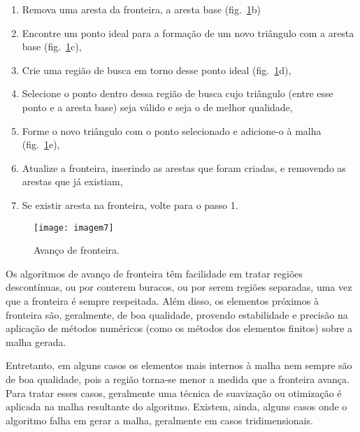  \begin{enumerate}
\item{ Remova uma aresta da fronteira, a aresta base (fig.~\ref{fig:imagem7}b)}
\item{ Encontre um ponto ideal para a formação de um novo triângulo com a aresta base (fig.~\ref{fig:imagem7}c),}
\item{ Crie uma região de busca em torno desse ponto ideal (fig.~\ref{fig:imagem7}d),}
\item{ Selecione o ponto dentro dessa região de busca cujo triângulo (entre esse ponto e a aresta base) seja válido e seja o de melhor qualidade,}
\item{ Forme o novo triângulo com o ponto selecionado e adicione-o à malha (fig.~\ref{fig:imagem7}e),}
\item{ Atualize a fronteira, inserindo as arestas que foram criadas, e removendo as arestas que já existiam,}
\item{ Se existir aresta na fronteira, volte para o passo 1.}
\end{enumerate}

 \begin{figure}[htbp]
     \centering
     \texttt{[image: imagem7]}
     \caption{Avanço de fronteira.}
     \label{fig:imagem7}
 \end{figure}

Os algoritmos de avanço de fronteira têm facilidade em tratar regiões descontínuas, ou por conterem buracos, ou por serem regiões separadas, uma vez que a fronteira é sempre respeitada. Além disso, os elementos próximos à fronteira são, geralmente, de boa qualidade, provendo estabilidade e precisão na aplicação de métodos numéricos (como os métodos dos elementos finitos) sobre a malha gerada.

Entretanto, em alguns casos os elementos mais internos à malha nem sempre são de boa qualidade, pois a região torna-se menor a medida que a fronteira avança. Para tratar esses casos, geralmente uma técnica de suavização ou otimização é aplicada na malha resultante do algoritmo. Existem, ainda, alguns casos onde o algoritmo falha em gerar a malha, geralmente em casos tridimensionais.




